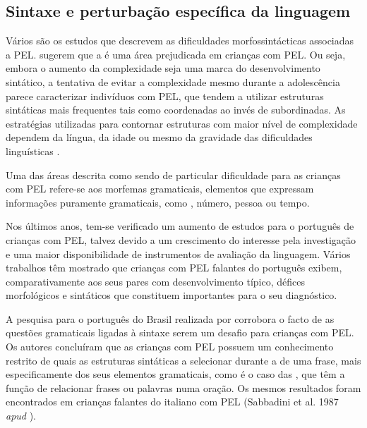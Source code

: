 \documentclass[output=paper]{LSP/langsci}
\begin{document}
\subsection{Sintaxe e perturbação específica da linguagem}
\label{subsec:martins_sintaxe_ple}

Vários são os estudos que descrevem as dificuldades morfossintácticas associadas a PEL. \citet{zebib_etal2012} sugerem que a  é uma área prejudicada em crianças com PEL. Ou seja, embora o aumento da complexidade seja uma marca do desenvolvimento sintático, a tentativa de evitar a complexidade mesmo durante a adolescência parece caracterizar indivíduos com PEL, que tendem a utilizar estruturas sintáticas mais frequentes tais como coordenadas ao invés de subordinadas. As estratégias utilizadas para contornar estruturas com maior nível de complexidade dependem da língua, da idade ou mesmo da gravidade das dificuldades linguísticas \citep{jakubowicztuller2008}.

Uma das áreas descrita como sendo de particular dificuldade para as crianças com PEL refere-se aos morfemas gramaticais, elementos que expressam informações puramente gramaticais, como , número, pessoa ou tempo. 

Nos últimos anos, tem-se verificado um aumento de estudos para o português de crianças com PEL, talvez devido a um crescimento do interesse pela investigação e uma maior disponibilidade de instrumentos de avaliação da linguagem. Vários trabalhos têm mostrado que crianças com PEL falantes do português exibem, comparativamente aos seus pares com desenvolvimento típico, défices morfológicos e sintáticos que constituem  importantes para o seu diagnóstico. 

A pesquisa para o português do Brasil realizada por \cite{puglisi_etal2005} corrobora o facto de as questões gramaticais ligadas à sintaxe serem um desafio para crianças com PEL. Os autores concluíram que as crianças com PEL possuem um conhecimento restrito de quais as estruturas sintáticas a selecionar durante a  de uma frase, mais especificamente dos seus elementos gramaticais, como é o caso das , que têm a função de relacionar frases ou palavras numa oração. Os mesmos resultados foram encontrados em crianças falantes do italiano com PEL (Sabbadini et al. 1987 \textit{apud} \citealt{leonard2000}).
\end{document}
